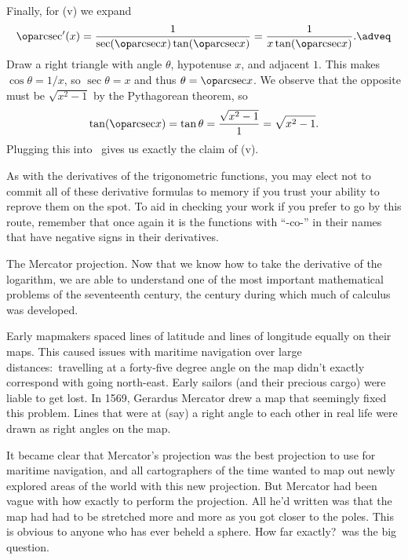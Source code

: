 Finally, for (v) we expand
\edef\eqarcsec{\the\eqcount}
$$\arcsec'(x) = {1\over \sec(\arcsec x) \tan(\arcsec x)} = {1\over x\tan(\arcsec x)}.\adveq$$
Draw a right triangle with angle $\theta$, hypotenuse $x$, and adjacent $1$. This makes $\cos\theta = 1/x$,
so $\sec\theta = x$ and thus $\theta = \arcsec x$.
We observe
that the opposite must be $\sqrt{x^2 - 1}$ by the Pythagorean theorem, so
$$\tan(\arcsec x) = \tan\theta = {\sqrt{x^2 -1}\over 1} = \sqrt{x^2-1}.$$
Plugging this into~\refeq{\eqarcsec} gives us exactly the claim of (v).\slug

As with the derivatives of the trigonometric functions, you may elect not to commit all of these derivative
formulas to memory if you trust your ability to reprove them on the spot. To aid in checking your work
if you prefer to go by this route, remember that once again it is the functions with ``-co-'' in their names
that have negative signs in their derivatives.

\medskip\boldlabel {} \llap{*}The Mercator projection.
Now that we know how to take the derivative of the logarithm, we are able to understand one of the most
important mathematical problems of the seventeenth century, the century during which much of calculus was
developed.

Early mapmakers spaced lines of latitude and lines of longitude equally on their maps. This caused issues
with maritime navigation over large distances:~travelling at a forty-five degree angle on the map didn't
exactly correspond with going north-east. Early sailors (and their precious cargo) were liable to get lost.
In 1569, Gerardus Mercator drew a map that seemingly fixed this problem. Lines that were at (say) a right
angle to each other in real life were drawn as right angles on the map.

It became clear that Mercator's projection was the best projection to use for maritime navigation, and
all cartographers of the time wanted to map out newly explored areas of the world with this new projection.
But Mercator had been vague with how exactly to perform the projection. All he'd written was that the
map had had to be stretched more and more as you got closer to the poles.
This is obvious to anyone who has ever beheld a sphere. How far exactly?~was the big question.

